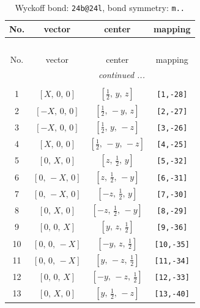 \documentclass[fleqn,8pt]{jsarticle}
\begin{document}
\begin{longtable}{cccc}
\caption{Wyckoff bond: {\tt 24b@24l}, bond symmetry: {\tt m..}}
 \\
 \hline \hline
No. & vector & center & mapping \\ \hline \endfirsthead

\multicolumn{3}{l}{\tablename\ \thetable{}} \\
 \hline \hline
No. & vector & center & mapping \\ \hline \endhead

 \hline \hline
\multicolumn{3}{r}{\footnotesize\it continued ...} \\ \endfoot

 \hline \hline
\multicolumn{3}{r}{} \\ \endlastfoot

1 & $\left[ X,\, 0,\, 0 \right]$ & $\left[ \frac{1}{2},\, y,\, z \right]$ & {\tt [1,-28]} \\ \hline
2 & $\left[ - X,\, 0,\, 0 \right]$ & $\left[ \frac{1}{2},\, - y,\, z \right]$ & {\tt [2,-27]} \\ \hline
3 & $\left[ - X,\, 0,\, 0 \right]$ & $\left[ \frac{1}{2},\, y,\, - z \right]$ & {\tt [3,-26]} \\ \hline
4 & $\left[ X,\, 0,\, 0 \right]$ & $\left[ \frac{1}{2},\, - y,\, - z \right]$ & {\tt [4,-25]} \\ \hline
5 & $\left[ 0,\, X,\, 0 \right]$ & $\left[ z,\, \frac{1}{2},\, y \right]$ & {\tt [5,-32]} \\ \hline
6 & $\left[ 0,\, - X,\, 0 \right]$ & $\left[ z,\, \frac{1}{2},\, - y \right]$ & {\tt [6,-31]} \\ \hline
7 & $\left[ 0,\, - X,\, 0 \right]$ & $\left[ - z,\, \frac{1}{2},\, y \right]$ & {\tt [7,-30]} \\ \hline
8 & $\left[ 0,\, X,\, 0 \right]$ & $\left[ - z,\, \frac{1}{2},\, - y \right]$ & {\tt [8,-29]} \\ \hline
9 & $\left[ 0,\, 0,\, X \right]$ & $\left[ y,\, z,\, \frac{1}{2} \right]$ & {\tt [9,-36]} \\ \hline
10 & $\left[ 0,\, 0,\, - X \right]$ & $\left[ - y,\, z,\, \frac{1}{2} \right]$ & {\tt [10,-35]} \\ \hline
11 & $\left[ 0,\, 0,\, - X \right]$ & $\left[ y,\, - z,\, \frac{1}{2} \right]$ & {\tt [11,-34]} \\ \hline
12 & $\left[ 0,\, 0,\, X \right]$ & $\left[ - y,\, - z,\, \frac{1}{2} \right]$ & {\tt [12,-33]} \\ \hline
13 & $\left[ 0,\, X,\, 0 \right]$ & $\left[ y,\, \frac{1}{2},\, - z \right]$ & {\tt [13,-40]} \\ \hline

\end{longtable}
\end{document}
